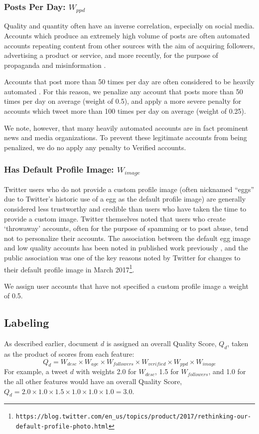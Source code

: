 \subsubsection{Posts Per Day: \(W_{ppd}\)}
Quality and quantity often have an inverse correlation, especially on social media.
Accounts which produce an extremely high volume of posts are often automated accounts repeating content from other sources with the aim of acquiring followers, advertising a product or service, and more recently, for the purpose of propaganda and misinformation \citep{Forelle15, Howard16}.

Accounts that post more than 50 times per day are often considered to be heavily automated \citep{Howard16}. For this reason, we penalize any account that posts more than 50 times per day on average (weight of 0.5), and apply a more severe penalty for accounts which tweet more than 100 times per day on average (weight of 0.25).

We note, however, that many heavily automated accounts are in fact prominent news and media organizations. To prevent these legitimate accounts from being penalized, we do no apply any penalty to Verified accounts.

\subsubsection{Has Default Profile Image: \(W_{image}\)}
Twitter users who do not provide a custom profile image (often nicknamed ``eggs'' due to Twitter's historic use of a egg as the default profile image) are generally considered less trustworthy and credible \citep{Castillo11,Sikdar13, Gun14} than users who have taken the time to provide a custom image.
Twitter themselves noted that users who create `throwaway' accounts, often for the purpose of spamming or to post abuse, tend not to personalize their accounts.
The association between the default egg image and low quality accounts has been noted in published work previously \citep{Sikdar13}, and the public association was one of the key reasons noted by Twitter for changes to their default profile image in March 2017\footnote{\texttt{https://blog.twitter.com/en\_us/topics/product/2017/rethinking-our-\\default-profile-photo.html}}.

We assign user accounts that have not specified a custom profile image a weight of 0.5.

\subsection{Labeling}
As described earlier, document \(d\) is assigned an overall Quality Score, \(Q_d\), taken as the product of scores from each feature:
\begin{equation}
	Q_d = W_{desc} \times W_{age} \times W_{followers} \times W_{verified} \times W_{ppd} \times W_{image}
\end{equation}
For example, a tweet \(d\) with weights 2.0 for \(W_{desc}\), 1.5 for \(W_{followers}\), and 1.0 for the all other features would have an overall Quality Score, \(
	Q_d =  2.0 \times 1.0 \times 1.5 \times 1.0 \times 1.0  \times 1.0 = 3.0 \).


